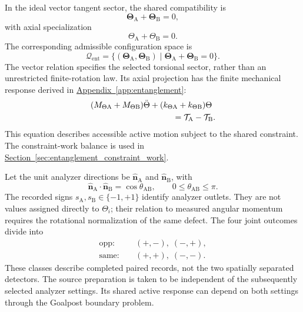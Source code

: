 In the ideal vector tangent sector, the shared compatibility is
\begin{equation}
    \boldsymbol\Theta_{\mathrm A}+\boldsymbol\Theta_{\mathrm B}=0,
    \label{eq:entanglement_vector_singlet_constraint}
\end{equation}
with axial specialization
\begin{equation}
    \Theta_{\mathrm A}+\Theta_{\mathrm B}=0.
    \label{eq:entanglement_scalar_singlet_constraint}
\end{equation}
The corresponding admissible configuration space is
\begin{equation}
    \mathcal Q_{\mathrm{ent}}
    =\bigl\{(\boldsymbol\Theta_{\mathrm A},\boldsymbol\Theta_{\mathrm B})
       \mid\boldsymbol\Theta_{\mathrm A}+\boldsymbol\Theta_{\mathrm B}=0\bigr\}.
    \label{eq:entanglement_constrained_configuration_space}
\end{equation}
The vector relation specifies the selected torsional sector, rather than an unrestricted finite-rotation law. Its axial projection has the finite mechanical response derived in \hyperref[app:entanglement]{Appendix~\ref*{app:entanglement}}:
\begin{equation}
    \begin{aligned}
    &(M_{\Theta\mathrm A}+M_{\Theta\mathrm B})\ddot\Theta
      +(k_{\Theta\mathrm A}+k_{\Theta\mathrm B})\Theta\\
    &\hspace{35mm}=\mathcal T_{\mathrm A}-\mathcal T_{\mathrm B}.
    \end{aligned}
\end{equation}
This equation describes accessible active motion subject to the shared constraint. The constraint-work balance is used in \hyperref[sec:entanglement_constraint_work]{Section~\ref*{sec:entanglement_constraint_work}}.

Let the unit analyzer directions be $\widehat{\mathbf n}_{\mathrm A}$ and $\widehat{\mathbf n}_{\mathrm B}$, with
\begin{equation}
    \widehat{\mathbf n}_{\mathrm A}\cdot\widehat{\mathbf n}_{\mathrm B}
    =\cos\theta_{\mathrm{AB}},
    \qquad 0\leq\theta_{\mathrm{AB}}\leq\pi.
    \label{eq:entanglement_analyzer_angle}
\end{equation}
The recorded signs $s_{\mathrm A},s_{\mathrm B}\in\{-1,+1\}$ identify analyzer outlets. They are not values assigned directly to $\Theta_i$; their relation to measured angular momentum requires the rotational normalization of the same defect. The four joint outcomes divide into
\begin{equation}
    \begin{aligned}
    \mathrm{opp}:&\quad(+,-),\;(-,+),\\
    \mathrm{same}:&\quad(+,+),\;(-,-).
    \end{aligned}
\end{equation}
These classes describe completed paired records, not the two spatially separated detectors. The source preparation is taken to be independent of the subsequently selected analyzer settings. Its shared active response can depend on both settings through the Goalpost boundary problem.

